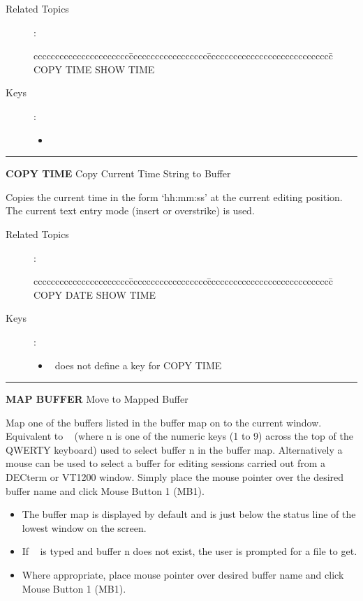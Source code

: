 \begin{description}
\item[Related Topics]:
\begin{tabbing}
cccccccccccccccccccccc\=cccccccccccccccccc\=ccccccccccccccccccccccccccccc\=\kill
COPY TIME \> SHOW TIME  \\
\end{tabbing}

\item[Keys]:
           \begin{itemize}
           \item \gold\ 
           \end{itemize}
\end{description}

\goodbreak

\rule{\textwidth}{0.3mm}

{\Large {\bf COPY TIME} \hfill Copy Current Time String to Buffer}

\medskip
  Copies the current time in the form `hh:mm:ss' at the current editing
  position. The current text entry mode (insert or overstrike) is used.

\begin{description}
\item[Related Topics]:
\begin{tabbing}
cccccccccccccccccccccc\=cccccccccccccccccc\=ccccccccccccccccccccccccccccc\=\kill
COPY DATE \> SHOW TIME \\
\end{tabbing}

\item[Keys]:
          \begin{itemize}
          \item \STEve\ does not define a key for COPY TIME
          \end{itemize}
\end{description}
\goodbreak

\rule{\textwidth}{0.3mm}

{\Large {\bf MAP BUFFER} \hfill Move to Mapped Buffer}

\medskip
  Map one of the buffers listed in the buffer map on to the current
  window. Equivalent to \gold\  (where n is one of the numeric
  keys (1 to 9) across the top of the QWERTY keyboard) used to select buffer n 
  in the buffer map. Alternatively a mouse can be used to select a buffer for 
  editing sessions carried out from a DECterm or VT1200 window. Simply place
  the mouse pointer over the desired buffer name and click Mouse Button 1
  (MB1).
  \begin{itemize}
  \item The buffer map is displayed by default and is just below the status
        line of the lowest window on the screen.
  \item If \gold\  is typed and buffer n does not exist, the user 
        is prompted for a file to get.
  \item Where appropriate, place mouse pointer over desired buffer name and
        click Mouse Button 1 (MB1).
  \end{itemize}


